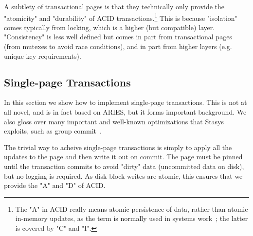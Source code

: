 \documentclass[letterpaper,twocolumn,10pt]{article}
\newcommand{\yad}{Stasys\xspace}
\newcommand{\eat}[1]{}
\begin{document}
A subtlety of transactional pages is that they technically only
provide the "atomicity" and "durability" of ACID transactions.\footnote{The "A" in ACID really means atomic persistence of data, rather than atomic in-memory updates, as the term is normally used in systems work~\cite{GR97}; the latter is covered by "C" and "I".}  This
is because "isolation" comes typically from locking, which is a higher
(but compatible) layer. "Consistency" is less well defined but comes
in part from transactional pages (from mutexes to avoid race
conditions), and in part from higher layers (e.g. unique key
requirements).


\eat{
\yad uses write-ahead-logging to support the
four properties of transactional storage: Atomicity, Consistency,
Isolation and Durability.  Like existing transactional storage sytems,
\yad allows applications to disable or choose different variants of each
property.

However, \yad takes customization of transactional semantics one step
further, allowing applications to add support for transactional
semantics that we have not anticipated.  We do not believe that
we can anticipate every possible variation of write ahead logging.  
However, we
have observed that most changes that we are interested in making
involve a few common underlying primitives.  

As we have
implemented new extensions, we have located portions of the system
that are prone to change, and have extended the API accordingly.  Our
goal is to allow applications to implement their own modules to
replace our implementations of each of the major write ahead logging
components.
}


\subsection{Single-page Transactions}

In this section we show how to implement single-page transactions.
This is not at all novel, and is in fact based on ARIES, but it forms
important background.  We also gloss over many important and
well-known optimizations that \yad exploits, such as group
commit~\cite{group-commit}.

The trivial way to acheive single-page transactions is simply to apply
all the updates to the page and then write it out on commit. The page
must be pinned until the transaction commits to avoid "dirty" data
(uncommitted data on disk), but no logging is required.  As disk
block writes are atomic, this ensures that we provide the "A" and "D"
of ACID.
\end{document}
